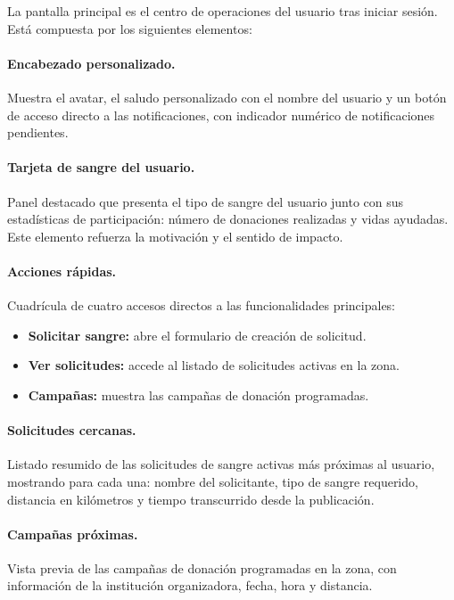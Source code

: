 La pantalla principal es el centro de operaciones del usuario tras iniciar sesión. Está compuesta por los siguientes elementos:

\paragraph{Encabezado personalizado.}
Muestra el avatar, el saludo personalizado con el nombre del usuario y un botón de acceso directo a las notificaciones, con indicador numérico de notificaciones pendientes.

\paragraph{Tarjeta de sangre del usuario.}
Panel destacado que presenta el tipo de sangre del usuario junto con sus estadísticas de participación: número de donaciones realizadas y vidas ayudadas. Este elemento refuerza la motivación y el sentido de impacto.

\paragraph{Acciones rápidas.}
Cuadrícula de cuatro accesos directos a las funcionalidades principales:

\begin{itemize}
    \item \textbf{Solicitar sangre:} abre el formulario de creación de solicitud.
    \item \textbf{Ver solicitudes:} accede al listado de solicitudes activas en la zona.
    \item \textbf{Campañas:} muestra las campañas de donación programadas.
\end{itemize}

\paragraph{Solicitudes cercanas.}
Listado resumido de las solicitudes de sangre activas más próximas al usuario, mostrando para cada una: nombre del solicitante, tipo de sangre requerido, distancia en kilómetros y tiempo transcurrido desde la publicación.

\paragraph{Campañas próximas.}
Vista previa de las campañas de donación programadas en la zona, con información de la institución organizadora, fecha, hora y distancia.

